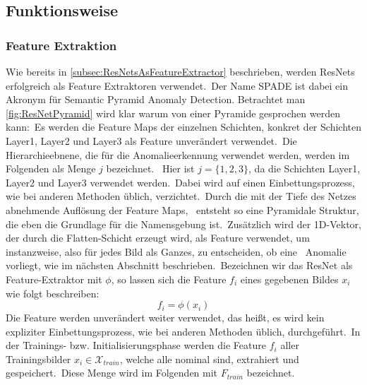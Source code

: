 \subsection{Funktionsweise}\label{subsec:SPADEFunktionsweise}
\subsubsection*{Feature Extraktion}
Wie bereits in \ref{subsec:ResNetsAsFeatureExtractor} beschrieben, werden ResNets erfolgreich als Feature Extraktoren verwendet.\
Der Name \glqq SPADE\grqq{} ist dabei ein Akronym für \glqq Semantic Pyramid Anomaly Detection\grqq{}. Betrachtet man \ref{fig:ResNetPyramid} wird klar warum von einer \glqq Pyramide\grqq{} gesprochen werden kann:\
Es werden die Feature Maps der einzelnen Schichten, konkret der Schichten \glqq Layer1, Layer2 und Layer3\grqq{} als Feature unverändert verwendet.\
Die Hierarchieebnene, die für die Anomalieerkennung verwendet werden, werden im Folgenden als Menge $j$ bezeichnet. \
Hier ist $j = \{1,2,3\}$, da die Schichten Layer1, Layer2 und Layer3 verwendet werden.\
Dabei wird auf einen Einbettungsprozess, wie bei anderen Methoden üblich, verzichtet.\ 
Durch die mit der Tiefe des Netzes abnehmende Auflösung der Feature Maps, \
entsteht so eine \glqq Pyramidale\grqq{} Struktur, die eben die Grundlage für die Namensgebung ist.\
Zusätzlich wird der 1D-Vektor, der durch die \glqq Flatten\grqq{}-Schicht erzeugt wird, als Feature verwendet, um instanzweise, also für jedes Bild als Ganzes, zu entscheiden, ob eine \
Anomalie vorliegt, wie im nächsten Abschnitt beschrieben.\
Bezeichnen wir das ResNet als Feature-Extraktor mit $\phi$, so lassen sich die Feature $f_{i}$ eines gegebenen Bildes $x_{i}$ wie folgt beschreiben:
$$f_{i} = \phi(x_{i})$$
Die Feature werden unverändert weiter verwendet, das heißt, es wird kein expliziter Einbettungsprozess, wie bei anderen Methoden üblich, durchgeführt.\
In der Trainings- bzw. Initialisierungsphase werden die Feature $f_{i}$ aller Trainingsbilder $x_{i}\in\mathcal{X}_{train}$, welche alle nominal sind, extrahiert und gespeichert.\
Diese Menge wird im Folgenden mit $F_{train}$ bezeichnet.\
